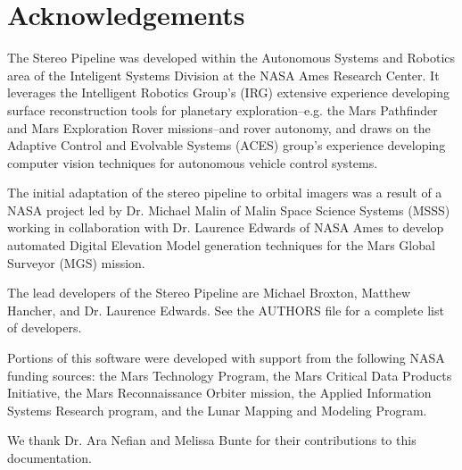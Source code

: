 \chapter*{Acknowledgements}

The Stereo Pipeline was developed within the Autonomous Systems and
Robotics area of the Inteligent Systems Division at the NASA Ames
Research Center.  It leverages the Intelligent Robotics Group's (IRG)
extensive experience developing surface reconstruction tools for
planetary exploration--e.g. the Mars Pathfinder and Mars Exploration
Rover missions--and rover autonomy, and draws on the Adaptive Control
and Evolvable Systems (ACES) group's experience developing computer
vision techniques for autonomous vehicle control systems.

The initial adaptation of the stereo pipeline to orbital imagers was a
result of a NASA project led by Dr. Michael Malin of Malin Space
Science Systems (MSSS) working in collaboration with Dr. Laurence
Edwards of NASA Ames to develop automated Digital Elevation Model
generation techniques for the Mars Global Surveyor (MGS) mission.

The lead developers of the Stereo Pipeline are Michael Broxton,
Matthew Hancher, and Dr. Laurence Edwards. See the AUTHORS file for a
complete list of developers.

Portions of this software were developed with support from the
following NASA funding sources: the Mars Technology Program, the Mars
Critical Data Products Initiative, the Mars Reconnaissance Orbiter
mission, the Applied Information Systems Research program, and the
Lunar Mapping and Modeling Program.

We thank Dr. Ara Nefian and Melissa Bunte for their contributions to
this documentation.
